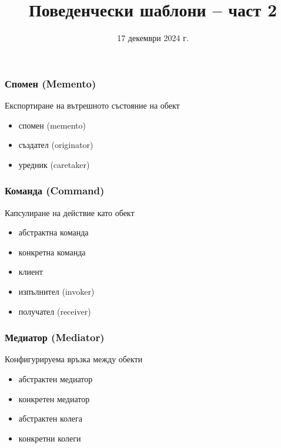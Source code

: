 \documentclass[alsotrans]{beamerswitch}
\title{Поведенчески  шаблони -- част 2}
\date{17 декември 2024 г.}
\begin{document}
\begin{frame}
  \titlepage
\end{frame}

\begin{frame}
  \frametitle{Спомен (Memento)}

  \begin{purpose}
    Експортиране на вътрешното състояние на обект
  \end{purpose}

  \pause
  \vspace{2ex}
  \comps
  \begin{itemize}
  \item спомен (memento)
  \item създател (originator)
  \item уредник (caretaker)
  \end{itemize}
\end{frame}

\begin{frame}
  \frametitle{Команда (Command)}

  \begin{purpose}
    Капсулиране на действие като обект
  \end{purpose}

  \pause
  \vspace{2ex}
  \comps
  \begin{itemize}[<+->]
  \item абстрактна команда
  \item конкретна команда
  \item клиент
  \item изпълнител (invoker)
  \item получател (receiver)
  \end{itemize}
\end{frame}

\begin{frame}
  \frametitle{Медиатор (Mediator)}

  \begin{purpose}
    Конфигурируема връзка между обекти
  \end{purpose}

  \pause
  \vspace{2ex}
  \comps
  \begin{itemize}[<+->]
  \item абстрактен медиатор
  \item конкретен медиатор
  \item абстрактен колега
  \item конкретни колеги
  \end{itemize}
\end{frame}
\end{document}
